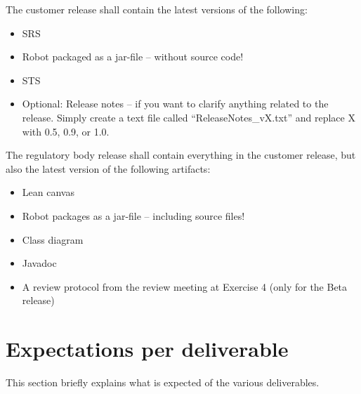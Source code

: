 \documentclass{scrreprt}
\begin{document}
The customer release shall contain the latest versions of the following:

\begin{itemize}
\item SRS
\item Robot packaged as a jar-file -- without source code!
\item STS
\item Optional: Release notes -- if you want to clarify anything related to the release. Simply create a text file called ``ReleaseNotes_vX.txt'' and replace X with 0.5, 0.9, or 1.0.
\end{itemize}

The regulatory body release shall contain everything in the customer release, but also the latest version of the following artifacts:
\begin{itemize}
\item Lean canvas
\item Robot packages as a jar-file -- including source files!
\item Class diagram
\item Javadoc
\item A review protocol from the review meeting at Exercise 4 (only for the Beta release)
\end{itemize}

\chapter{Expectations per deliverable}
This section briefly explains what is expected of the various deliverables.
\end{document}
